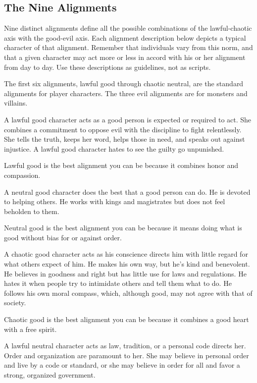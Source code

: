     \subsection{The Nine Alignments}
        Nine distinct alignments define all the possible combinations of the lawful-chaotic axis with the good-evil axis. Each alignment description below depicts a typical character of that alignment. Remember that individuals vary from this norm, and that a given character may act more or less in accord with his or her alignment from day to day. Use these descriptions as guidelines, not as scripts.

        The first six alignments, lawful good through chaotic neutral, are the standard alignments for player characters. The three evil alignments are for monsters and villains.

         A lawful good character acts as a good person is expected or required to act. She combines a commitment to oppose evil with the discipline to fight relentlessly. She tells the truth, keeps her word, helps those in need, and speaks out against injustice. A lawful good character hates to see the guilty go unpunished.

        Lawful good is the best alignment you can be because it combines honor and compassion.

         A neutral good character does the best that a good person can do. He is devoted to helping others. He works with kings and magistrates but does not feel beholden to them.

        Neutral good is the best alignment you can be because it means doing what is good without bias for or against order.

         A chaotic good character acts as his conscience directs him with little regard for what others expect of him. He makes his own way, but he's kind and benevolent. He believes in goodness and right but has little use for laws and regulations. He hates it when people try to intimidate others and tell them what to do. He follows his own moral compass, which, although good, may not agree with that of society.

        Chaotic good is the best alignment you can be because it combines a good heart with a free spirit.

         A lawful neutral character acts as law, tradition, or a personal code directs her. Order and organization are paramount to her. She may believe in personal order and live by a code or standard, or she may believe in order for all and favor a strong, organized government.

